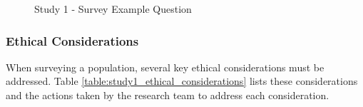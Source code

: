 \documentclass[manuscript,screen,review]{acmart}
\begin{document}
\begin{figure}[h]
    \caption{Study 1 - Survey Example Question}
  \label{fig:example_survey_question}
\end{figure}

\subsubsection{Ethical Considerations} 
\label{study1_ethics}

When surveying a population, several key ethical considerations must be addressed. Table \ref{table:study1_ethical_considerations} lists these considerations and the actions taken by the research team to address each consideration.
\end{document}
